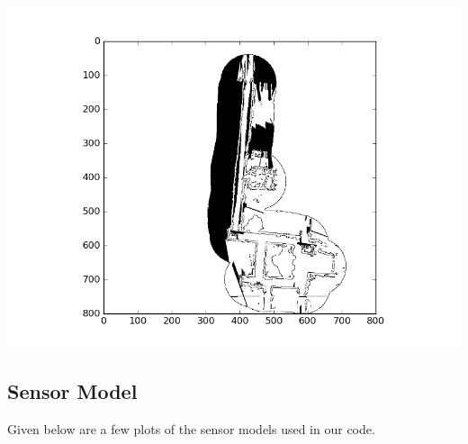 \documentclass{article}
\begin{document}
\includegraphics[width=\textwidth]{map1}

\pagebreak

\subsection{Sensor Model}
Given below are a few plots of the sensor models used in our code.
\end{document}
